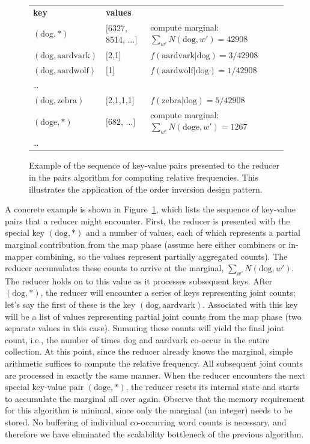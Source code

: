 \begin{figure}[t]
\begin{tabular}{lll}
\textbf{key} & \textbf{values} &  \\
$(\textrm{dog}, \ast)$        & $[$6327, 8514, $\ldots$$]$ & compute marginal: $\sum_{w'}{N(\textrm{dog},w')} = 42908$\\
$(\textrm{dog}, \textrm{aardvark})$ & $[$2,1$]$    & $f(\textrm{aardvark}|\textrm{dog}) = 3/42908$ \\
$(\textrm{dog}, \textrm{aardwolf})$ & $[$1$]$      & $f(\textrm{aardwolf}|\textrm{dog}) = 1/42908$ \\
\ldots            &      & \\
$(\textrm{dog}, \textrm{zebra})$    & $[$2,1,1,1$]$    & $f(\textrm{zebra}|\textrm{dog}) = 5/42908$ \\
$(\textrm{doge}, \ast)$       & $[$682, $\ldots$$]$  & compute marginal: $\sum_{w'}{N(\textrm{doge},w')} = 1267$\\
\ldots            &      & \\
\end{tabular}
\caption{Example of the sequence of key-value pairs presented to the
  reducer in the pairs algorithm for computing relative frequencies.
  This illustrates the application of the order inversion design
  pattern.}
\label{figure:chapter3:cond-prob-reducer}
\end{figure}

A concrete example is shown in
Figure~\ref{figure:chapter3:cond-prob-reducer}, which lists the
sequence of key-value pairs that a reducer might encounter.  First,
the reducer is presented with the special key $(\textrm{dog}, \ast)$
and a number of values, each of which represents a partial marginal
contribution from the map phase (assume here either combiners or
in-mapper combining, so the values represent partially aggregated
counts).  The reducer accumulates these counts to arrive at the
marginal, $\sum_{w'}{N(\textrm{dog},w')}$.  The reducer holds on to
this value as it processes subsequent keys.  After $(\textrm{dog},
\ast)$, the reducer will encounter a series of keys representing joint
counts; let's say the first of these is the key $(\textrm{dog},
\textrm{aardvark})$.  Associated with this key will be a list of
values representing partial joint counts from the map phase (two
separate values in this case).  Summing these counts will yield the
final joint count, i.e., the number of times dog and aardvark co-occur
in the entire collection.  At this point, since the reducer already
knows the marginal, simple arithmetic suffices to compute the relative
frequency.  All subsequent joint counts are processed in exactly the
same manner.  When the reducer encounters the next special key-value
pair $(\textrm{doge}, \ast)$, the reducer resets its internal state
and starts to accumulate the marginal all over again.  Observe that
the memory requirement for this algorithm is minimal, since only the
marginal (an integer) needs to be stored.  No buffering of individual
co-occurring word counts is necessary, and therefore we have
eliminated the scalability bottleneck of the previous algorithm.

